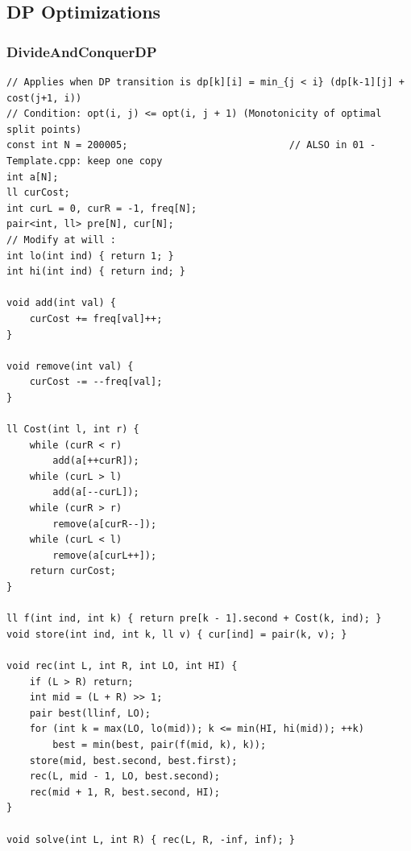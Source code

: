 \documentclass[9pt,a4paper,twocolumn]{extarticle}
\begin{document}
\subsection{DP Optimizations}

\filbreak
\subsubsection{DivideAndConquerDP}
\nopagebreak
\begin{lstlisting}
// Applies when DP transition is dp[k][i] = min_{j < i} (dp[k-1][j] + cost(j+1, i))
// Condition: opt(i, j) <= opt(i, j + 1) (Monotonicity of optimal split points)
const int N = 200005;                            // ALSO in 01 - Template.cpp: keep one copy
int a[N];
ll curCost;
int curL = 0, curR = -1, freq[N];
pair<int, ll> pre[N], cur[N];
// Modify at will :
int lo(int ind) { return 1; }
int hi(int ind) { return ind; }

void add(int val) {
    curCost += freq[val]++;
}

void remove(int val) {
    curCost -= --freq[val];
}

ll Cost(int l, int r) {
    while (curR < r)
        add(a[++curR]);
    while (curL > l)
        add(a[--curL]);
    while (curR > r)
        remove(a[curR--]);
    while (curL < l)
        remove(a[curL++]);
    return curCost;
}

ll f(int ind, int k) { return pre[k - 1].second + Cost(k, ind); }
void store(int ind, int k, ll v) { cur[ind] = pair(k, v); }

void rec(int L, int R, int LO, int HI) {
    if (L > R) return;
    int mid = (L + R) >> 1;
    pair best(llinf, LO);
    for (int k = max(LO, lo(mid)); k <= min(HI, hi(mid)); ++k)
        best = min(best, pair(f(mid, k), k));
    store(mid, best.second, best.first);
    rec(L, mid - 1, LO, best.second);
    rec(mid + 1, R, best.second, HI);
}

void solve(int L, int R) { rec(L, R, -inf, inf); }
\end{lstlisting}

\filbreak
\end{document}
